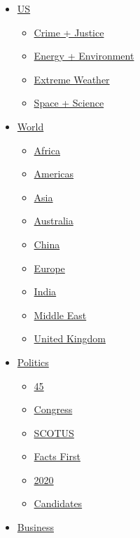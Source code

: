 \begin{itemize}
\tightlist
\item
  \href{/us}{US}

  \begin{itemize}
  \tightlist
  \item
    \href{/specials/us/crime-and-justice}{Crime + Justice}
  \item
    \href{/specials/us/energy-and-environment}{Energy + Environment}
  \item
    \href{/specials/us/extreme-weather}{Extreme Weather}
  \item
    \href{/specials/space-science}{Space + Science}
  \end{itemize}
\item
  \href{/world}{World}

  \begin{itemize}
  \tightlist
  \item
    \href{/africa}{Africa}
  \item
    \href{/americas}{Americas}
  \item
    \href{/asia}{Asia}
  \item
    \href{/australia}{Australia}
  \item
    \href{/china}{China}
  \item
    \href{/europe}{Europe}
  \item
    \href{/india}{India}
  \item
    \href{/middle-east}{Middle East}
  \item
    \href{/uk}{United Kingdom}
  \end{itemize}
\item
  \href{/politics}{Politics}

  \begin{itemize}
  \tightlist
  \item
    \href{/specials/politics/president-donald-trump-45}{45}
  \item
    \href{/specials/politics/congress-capitol-hill}{Congress}
  \item
    \href{/specials/politics/supreme-court-nine}{SCOTUS}
  \item
    \href{/specials/politics/fact-check-politics}{Facts First}
  \item
    \href{/specials/politics/2020-election-coverage}{2020}
  \item
    \href{/election/2020/candidates}{Candidates}
  \end{itemize}
\item
  \href{/business}{Business}


\end{itemize}
